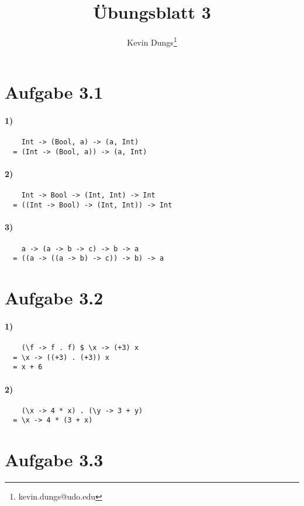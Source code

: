 \documentclass[a4paper]{scrartcl}
\title{Übungsblatt 3}
\author{Kevin Dungs\thanks{kevin.dungs@udo.edu}}
\begin{document}
\maketitle

\section{Aufgabe 3.1}
\paragraph{1)}
\begin{verbatim}
    Int -> (Bool, a) -> (a, Int)
  = (Int -> (Bool, a)) -> (a, Int)
\end{verbatim}

\paragraph{2)}
\begin{verbatim}
    Int -> Bool -> (Int, Int) -> Int
  = ((Int -> Bool) -> (Int, Int)) -> Int
\end{verbatim}

\paragraph{3)}
\begin{verbatim}
    a -> (a -> b -> c) -> b -> a
  = ((a -> ((a -> b) -> c)) -> b) -> a
\end{verbatim}


\section{Aufgabe 3.2}
\paragraph{1)}
\begin{verbatim}
    (\f -> f . f) $ \x -> (+3) x
  = \x -> ((+3) . (+3)) x
  = x + 6
\end{verbatim}

\paragraph{2)}
\begin{verbatim}
    (\x -> 4 * x) . (\y -> 3 + y)
  = \x -> 4 * (3 + x)
\end{verbatim}


\section{Aufgabe 3.3}
\end{document}
